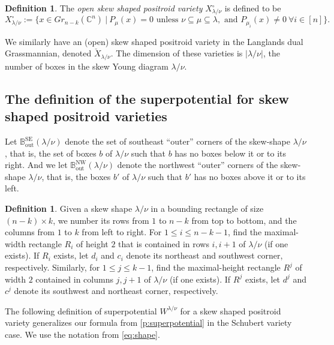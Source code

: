 \documentclass{amsart}
\theoremstyle{definition}
\newtheorem{definition}[thm]{Definition}
\numberwithin{equation}{section}
\def\NW{\operatorname{NW}}
\def\SE{\operatorname{SE}}
\def\out{\operatorname{out}}
\newcommand{\C}{\mathbb{C}}
\newcommand{\BB}{{\mathbb B}}
\begin{document}
\begin{definition}\label{d:SkewSchubertCell}
The \emph{open skew shaped positroid variety} 
$X^{\circ}_{\lambda/\nu}$ is defined to be 
\begin{equation*}
X_{\lambda/\nu}^{\circ}:= 
	\{x\in Gr_{n-k}(\C^n) \ | \ P_{\mu}(x)=0 \text{ unless }
	           \nu \subseteq \mu \subseteq \lambda, \text{ and } P_{\mu_i}(x)\ne 0 \ \forall i\in[n] \}.
\end{equation*}
\end{definition}
We similarly have an (open) skew shaped positroid variety
in the Langlands dual Grassmannian, denoted
 $\check{X}_{\lambda/\nu}$.
The dimension of these varieties is $|\lambda/\nu|$, the 
number of boxes in the skew Young diagram $\lambda/\nu$.





\subsection{The definition of the superpotential for skew shaped positroid varieties}

Let $\BB^{\SE}_{\out}(\lambda/\nu)$ denote the set of southeast ``outer'' corners of the 
skew-shape $\lambda/\nu$, that is, the set of boxes $b$ of 
$\lambda/\nu$ such that $b$ has no boxes below it or to its 
right.
And we let $\BB^{\NW}_{\out}(\lambda/\nu)$ denote the northwest ``outer'' corners of the 
skew-shape $\lambda/\nu$, that is, the  boxes $b'$ of 
$\lambda/\nu$ such that $b'$ has no boxes above it or to its left.

\begin{definition}
Given a skew shape $\lambda/\nu$ in a bounding rectangle of size $(n-k) \times k$,
we
number its  rows from $1$ to $n-k$ from top to bottom,
and the columns from $1$ to $k$ from left to right.
For $1\leq i \leq n-k-1$, find the maximal-width rectangle $R_i$ of height $2$
that is contained in rows $i, i+1$ of $\lambda/\nu$ (if one exists).
If $R_i$ exists, let $d_i$ and $c_i$ denote its
northeast and southwest corner,
respectively.
Similarly, for $1\leq j \leq k-1$, find the maximal-height rectangle $R^j$
of width $2$ contained in columns $j, j+1$ of $\lambda/\nu$ (if one exists).
If $R^j$ exists, 
let $d^j$ and $c^j$ denote its southwest and northeast corner, respectively.
\end{definition}

The following definition of superpotential $W^{\lambda/\nu}$
for a skew shaped positroid variety generalizes our formula from \cref{p:superpotential}
in the Schubert variety case.
We use the notation from \eqref{eq:shape}.
\end{document}
